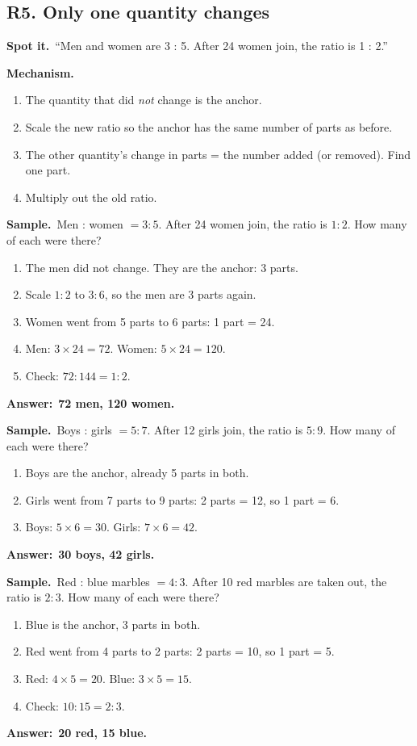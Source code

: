 \documentclass[11pt,a4paper]{article}
\let\oldsubsection\subsection
\renewcommand{\subsection}{\needspace{9\baselineskip}\oldsubsection}
\newcommand{\spot}{\textbf{\color{ember}Spot it.}\ }
\newcommand{\mech}{\textbf{\color{ember}Mechanism.}\ }
\newif\ifkeepsamp
\newcommand{\ans}[1]{\par\nopagebreak\noindent\textbf{\color{ember}Answer:}\ \textbf{#1}\par}
\newcommand{\samp}{\ifkeepsamp\needspace{4\baselineskip}\fi\textbf{\color{ember}Sample.}\ }
\begin{document}
\subsection{R5. Only one quantity changes}
\spot ``Men and women are 3 : 5. After 24 women join, the ratio is 1 : 2.''

\mech
\begin{enumerate}
\item The quantity that did \emph{not} change is the anchor.
\item Scale the new ratio so the anchor has the same number of parts as before.
\item The other quantity's change in parts = the number added (or removed). Find one part.
\item Multiply out the old ratio.
\end{enumerate}

\samp Men : women $= 3 : 5$. After 24 women join, the ratio is $1 : 2$. How many of each were there?
\begin{enumerate}
\item The men did not change. They are the anchor: 3 parts.
\item Scale $1 : 2$ to $3 : 6$, so the men are 3 parts again.
\item Women went from 5 parts to 6 parts: 1 part = 24.
\item Men: $3 \times 24 = 72$. Women: $5 \times 24 = 120$.
\item Check: $72 : 144 = 1 : 2$.
\end{enumerate}
\ans{72 men, 120 women.}

\samp Boys : girls $= 5 : 7$. After 12 girls join, the ratio is $5 : 9$. How many of each were there?
\begin{enumerate}
\item Boys are the anchor, already 5 parts in both.
\item Girls went from 7 parts to 9 parts: 2 parts = 12, so 1 part = 6.
\item Boys: $5 \times 6 = 30$. Girls: $7 \times 6 = 42$.
\end{enumerate}
\ans{30 boys, 42 girls.}

\samp Red : blue marbles $= 4 : 3$. After 10 red marbles are taken out, the ratio is $2 : 3$. How many of each were there?
\begin{enumerate}
\item Blue is the anchor, 3 parts in both.
\item Red went from 4 parts to 2 parts: 2 parts = 10, so 1 part = 5.
\item Red: $4 \times 5 = 20$. Blue: $3 \times 5 = 15$.
\item Check: $10 : 15 = 2 : 3$.
\end{enumerate}
\ans{20 red, 15 blue.}
\end{document}
